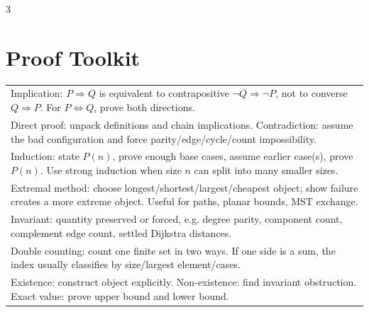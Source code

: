 \documentclass[10pt]{article}
\begin{document}
\begin{multicols*}{3}
\scriptsize
\raggedcolumns

\section*{Proof Toolkit}
\begin{tabular}{@{}p{}@{}}
Implication: \(P\Rightarrow Q\) is equivalent to contrapositive \(\neg Q\Rightarrow \neg P\), not to converse \(Q\Rightarrow P\). For \(P\Longleftrightarrow Q\), prove both directions.\\
Direct proof: unpack definitions and chain implications. Contradiction: assume the bad configuration and force parity/edge/cycle/count impossibility.\\
Induction: state \(P(n)\), prove enough base cases, assume earlier case(s), prove \(P(n)\). Use strong induction when size \(n\) can split into many smaller sizes.\\
Extremal method: choose longest/shortest/largest/cheapest object; show failure creates a more extreme object. Useful for paths, planar bounds, MST exchange.\\
Invariant: quantity preserved or forced, e.g. degree parity, component count, complement edge count, settled Dijkstra distances.\\
Double counting: count one finite set in two ways. If one side is a sum, the index usually classifies by size/largest element/cases.\\
Existence: construct object explicitly. Non-existence: find invariant obstruction. Exact value: prove upper bound and lower bound.\\
\end{tabular}


\end{multicols*}
\end{document}
